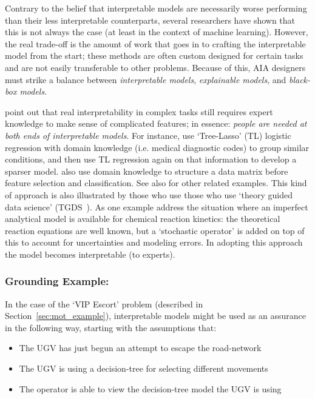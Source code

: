 Contrary to the belief that interpretable models are necessarily worse performing than their less interpretable counterparts, several researchers have shown that this is not always the case (at least in the context of machine learning). However, the real trade-off is the amount of work that goes in to crafting the interpretable model from the start; these methods are often custom designed for certain tasks and are not easily transferable to other problems. Because of this, AIA designers must strike a balance between \emph{interpretable models}, \emph{explainable models}, and \emph{black-box models}.

\citet{Park2016-ld} point out that real interpretability in complex tasks still requires expert knowledge to make sense of complicated features; in essence: \emph{people are needed at both ends of interpretable models}. For instance, \citet{Jovanovic2016-gw} use `Tree-Lasso' (TL) logistic regression with domain knowledge (i.e. medical diagnostic codes) to group similar conditions, and then use TL regression again on that information to develop a sparser model. \citet{Zycinski2012-jj} also use domain knowledge to structure a data matrix before feature selection and classification. See also \citet{Zhang2018-no,Khoa2018-gh} for other related examples. 
%
This kind of approach is also illustrated by those who use those who use `theory guided data science' (TGDS~\cite{Kumar2016-yw,Faghmous2014-og}). As one example \citet{Morrison2016-fz} address the situation where an imperfect analytical model is available for chemical reaction kinetics: the theoretical reaction equations are well known, but a `stochastic operator' is added on top of this to account for uncertainties and modeling errors. In adopting this approach the model becomes interpretable (to experts).

\subsubsection{Grounding Example:}
In the case of the `VIP Escort' problem (described in Section~\ref{sec:mot_example}), interpretable models might be used as an assurance in the following way, starting with the assumptions that:

\begin{itemize}
    \item The UGV has just begun an attempt to escape the road-network
    \item The UGV is using a decision-tree for selecting different movements
    \item The operator is able to view the decision-tree model the UGV is using
\end{itemize}

